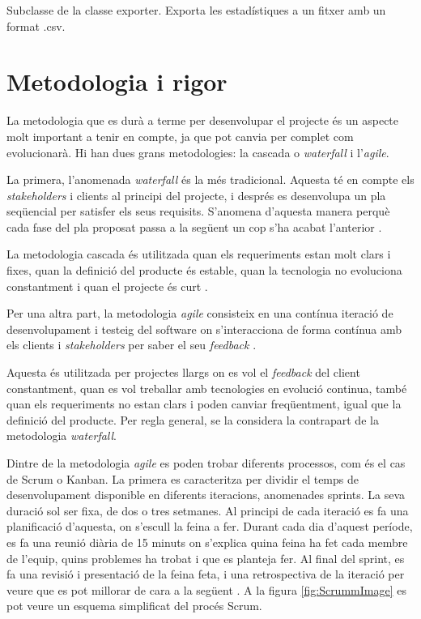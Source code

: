 \documentclass[a4paper]{article}
\begin{document}
Subclasse de la classe exporter. Exporta les estadístiques a un fitxer amb un format .csv.

\newpage
\section{Metodologia i rigor}
La metodologia que es durà a terme per desenvolupar el projecte és un aspecte molt important a tenir en compte, ja que pot canvia per complet com evolucionarà. Hi han dues grans metodologies: la cascada o \textit{waterfall} i l'\textit{agile}.

La primera, l'anomenada \textit{waterfall} és la més tradicional. Aquesta té en compte els \textit{stakeholders} i clients al principi del projecte, i després es desenvolupa un pla seqüencial per satisfer els seus requisits. S'anomena d'aquesta manera perquè cada fase del pla proposat passa a la següent un cop s'ha acabat l'anterior \cite{waterfallModel}.

La metodologia cascada és utilitzada quan els requeriments estan molt clars i fixes, quan la definició del producte és estable, quan la tecnologia no evoluciona constantment i quan el projecte és curt \cite{waterfallTutorialsPoint}.

Per una altra part, la metodologia \textit{agile} consisteix en una contínua iteració de desenvolupament i testeig del software on s'interacciona de forma contínua amb els clients i \textit{stakeholders} per saber el seu \textit{feedback} \cite{agileVsWaterfall}.

Aquesta és utilitzada per projectes llargs on es vol el \textit{feedback} del client constantment, quan es vol treballar amb tecnologies en evolució continua, també quan els requeriments no estan clars i poden canviar freqüentment, igual que la definició del producte. Per regla general, se la considera la contrapart de la metodologia \textit{waterfall}. 

Dintre de la metodologia \textit{agile} es poden trobar diferents processos, com és el cas de Scrum o Kanban. La primera es caracteritza per dividir el temps de desenvolupament disponible en diferents iteracions, anomenades sprints. La seva duració sol ser fixa,  de dos o tres setmanes. Al principi de cada iteració es fa una planificació d'aquesta, on s'escull la feina a fer. Durant cada dia d'aquest període, es fa una reunió diària de 15 minuts on s'explica quina feina ha fet cada membre de l'equip, quins problemes ha trobat i que es planteja fer. Al final del sprint, es fa una revisió i presentació de la feina feta, i una retrospectiva de la iteració per veure que es pot millorar de cara a la següent \cite{wikipediaScrum}. A la figura \ref{fig:ScrummImage} es pot veure un esquema simplificat del procés Scrum.
\end{document}
